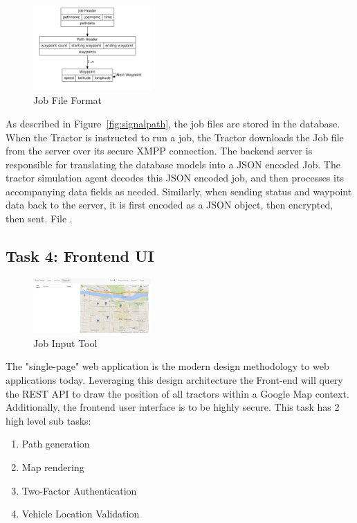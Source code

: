 \documentclass[conference,12pt]{IEEEtran}
\begin{document}
\begin{figure}
\centering
\includegraphics[width=0.4\textwidth]{Images/job_file.png}
\caption{Job File Format}
\label{fig:jobfile}
\end{figure}

As described in Figure~\ref{fig:signalpath}, the job files are stored in the
database. When the Tractor is instructed to run a job, the Tractor downloads the
Job file from the server over its secure XMPP connection. The backend server is
responsible for translating the database models into a JSON encoded Job. The tractor simulation agent decodes this JSON encoded job, and then processes its accompanying data fields as needed. Similarly, when sending status and waypoint data back to the server, it is first encoded as a JSON object, then encrypted, then sent. 
File \autocite{_json_2014}.

\subsection{Task 4: Frontend UI}
\begin{figure}
\centering
\includegraphics[width=0.4\textwidth]{Images/PlottingV1.png}
\caption{Job Input Tool}
\label{fig:jobinput}
\end{figure}

The "single-page" web application is the modern design methodology to web
applications today. Leveraging this design architecture the Front-end will query the REST API
to draw the position of all tractors within a Google Map context. Additionally, 
the frontend user interface is to be highly secure. This task has
2 high level sub tasks:

\begin{enumerate}
\item Path generation
\item Map rendering
\item Two-Factor Authentication
\item Vehicle Location Validation
\end{enumerate}
\end{document}
